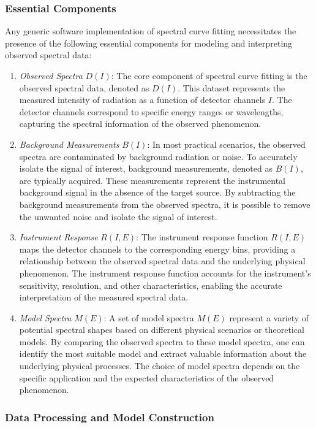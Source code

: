     		\subsubsection{Essential Components}
    			Any generic software implementation of spectral curve fitting necessitates the presence of the following essential components for modeling and interpreting observed spectral data:
    			\begin{enumerate}
    				\item \textit{Observed Spectra} $D(I)$: The core component of spectral curve fitting is the observed spectral data, denoted as $D(I)$. This dataset represents the measured intensity of radiation as a function of detector channels $I$. The detector channels correspond to specific energy ranges or wavelengths, capturing the spectral information of the observed phenomenon.
    				\item \textit{Background Measurements} $B(I)$: In most practical scenarios, the observed spectra are contaminated by background radiation or noise. To accurately isolate the signal of interest, background measurements, denoted as $B(I)$, are typically acquired. These measurements represent the instrumental background signal in the absence of the target source. By subtracting the background measurements from the observed spectra, it is possible to remove the unwanted noise and isolate the signal of interest.
    				\item \textit{Instrument Response} $R(I,E)$: The instrument response function $R(I,E)$ maps the detector channels to the corresponding energy bins, providing a relationship between the observed spectral data and the underlying physical phenomenon. The instrument response function accounts for the instrument's sensitivity, resolution, and other characteristics, enabling the accurate interpretation of the measured spectral data.
    				\item \textit{Model Spectra} $M(E)$: A set of model spectra $M(E)$ represent a variety of potential spectral shapes based on different physical scenarios or theoretical models. By comparing the observed spectra to these model spectra, one can identify the most suitable model and extract valuable information about the underlying physical processes. The choice of model spectra depends on the specific application and the expected characteristics of the observed phenomenon.
    			\end{enumerate}
    		
    		\subsubsection{Data Processing and Model Construction}
